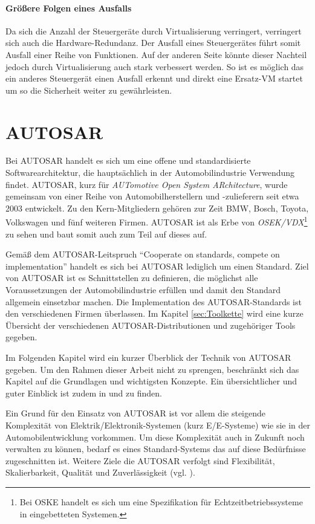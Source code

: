 \documentclass[
  a4paper,					    %
  twoside,
  DIV=calc,     				%
  bibliography=totoc,
  cleardoublepage=empty,
  ngerman,     					%
  final       					%
]{scrbook}
\begin{document}
\paragraph{Größere Folgen eines Ausfalls}
Da sich die Anzahl der Steuergeräte durch Virtualisierung verringert, verringert sich auch die Hardware-Redundanz. Der Ausfall eines Steuergerätes führt somit Ausfall einer Reihe von Funktionen. Auf der anderen Seite könnte dieser Nachteil jedoch durch Virtualisierung auch stark verbessert werden. So ist es möglich das ein anderes Steuergerät einen Ausfall erkennt und direkt eine Ersatz-VM startet um so die Sicherheit weiter zu gewährleisten. 


\section{AUTOSAR}
\label{sec:Autosar}
Bei AUTOSAR handelt es sich um eine offene und standardisierte Softwarearchitektur, die hauptsächlich in der Automobilindustrie Verwendung findet. AUTOSAR, kurz für \emph{AUTomotive Open System ARchitecture}, wurde gemeinsam von einer Reihe von Automobilherstellern und -zulieferern seit etwa 2003 entwickelt. Zu den Kern-Mitgliedern gehören zur Zeit BMW, Bosch, Toyota, Volkswagen und fünf weiteren Firmen. AUTOSAR ist als Erbe von \emph{OSEK/VDX}\footnote{Bei OSKE handelt es sich um eine Spezifikation für Echtzeitbetriebssysteme in eingebetteten Systemen.} zu sehen und baut somit auch zum Teil auf dieses auf.

Gemäß dem AUTOSAR-Leitspruch "`Cooperate on standards, compete on implementation"' handelt es sich bei AUTOSAR lediglich um einen Standard. Ziel von AUTOSAR ist es Schnittstellen zu definieren, die möglichst alle Voraussetzungen der Automobilindustrie erfüllen und damit den Standard allgemein einsetzbar machen. Die Implementation des AUTOSAR-Standards ist den verschiedenen Firmen überlassen. Im Kapitel \ref{sec:Toolkette} wird eine kurze Übersicht der verschiedenen AUTOSAR-Distributionen und zugehöriger Tools gegeben.

Im Folgenden Kapitel wird ein kurzer Überblick der Technik von AUTOSAR gegeben. Um den Rahmen dieser Arbeit nicht zu sprengen, beschränkt sich das Kapitel auf die Grundlagen und wichtigsten Konzepte. Ein übersichtlicher und guter Einblick ist zudem in \cite{autosar_layer} und \cite{autosar_techoverview} zu finden.

Ein Grund für den Einsatz von AUTOSAR ist vor allem die steigende Komplexität von Elektrik/Elektronik-Systemen (kurz E/E-Systeme) wie sie in der Automobilentwicklung vorkommen. Um diese Komplexität auch in Zukunft noch verwalten zu können, bedarf es eines Standard-Systems das auf diese Bedürfnisse zugeschnitten ist. Weitere Ziele die AUTOSAR verfolgt sind Flexibilität, Skalierbarkeit, Qualität und Zuverlässigkeit (vgl. \cite[S. 5]{autosar_techoverview}).
\end{document}
